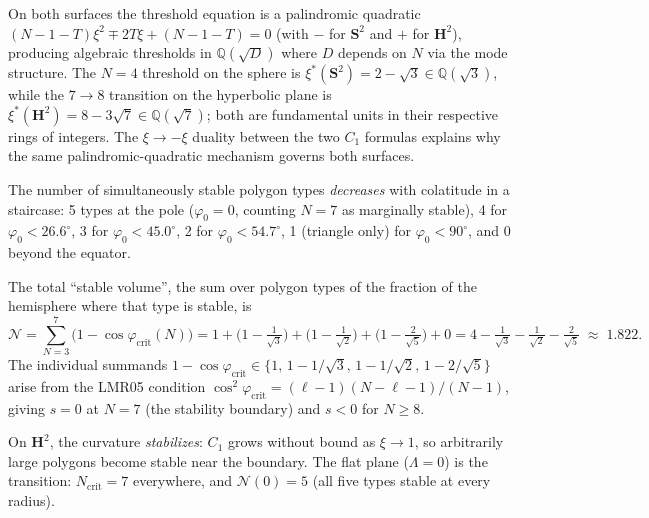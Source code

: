 \begin{remark}
On both surfaces the threshold equation is a palindromic quadratic
$(N{-}1{-}T)\xi^2 \mp 2T\xi + (N{-}1{-}T) = 0$ (with $-$ for
$\mathbf{S}^2$ and $+$ for $\mathbf{H}^2$), producing algebraic
thresholds in $\mathbb{Q}(\sqrt{D})$ where $D$ depends on $N$ via
the mode structure.  The $N = 4$ threshold on the sphere is
$\xi^*(\mathbf{S}^2) = 2 - \sqrt{3} \in \mathbb{Q}(\sqrt{3})$,
while the $7 \to 8$ transition on the hyperbolic plane is
$\xi^*(\mathbf{H}^2) = 8 - 3\sqrt{7} \in \mathbb{Q}(\sqrt{7})$;
both are fundamental units in their respective rings of integers.
The $\xi \to -\xi$ duality between the two $C_1$ formulas explains
why the same palindromic-quadratic mechanism governs both surfaces.
\end{remark}

\begin{remark}
\label{rmk:stability-staircase}
The number of simultaneously stable polygon types \emph{decreases}
with colatitude in a staircase:
5 types at the pole ($\varphi_0 = 0$, counting $N = 7$ as marginally stable),
4 for $\varphi_0 < 26.6^\circ$,
3 for $\varphi_0 < 45.0^\circ$,
2 for $\varphi_0 < 54.7^\circ$,
1 (triangle only) for $\varphi_0 < 90^\circ$,
and 0 beyond the equator.

The total ``stable volume'', the sum over polygon types of the
fraction of the hemisphere where that type is stable, is
\begin{equation}\label{eq:counting-function}
  \mathcal{N} = \sum_{N=3}^{7}
    \bigl(1 - \cos\varphi_{\mathrm{crit}}(N)\bigr)
  = 1 + \bigl(1 - \tfrac{1}{\sqrt{3}}\bigr) + \bigl(1 - \tfrac{1}{\sqrt{2}}\bigr)
    + \bigl(1 - \tfrac{2}{\sqrt{5}}\bigr) + 0
  = 4 - \tfrac{1}{\sqrt{3}} - \tfrac{1}{\sqrt{2}} - \tfrac{2}{\sqrt{5}}
  \;\approx\; 1.822.
\end{equation}
The individual summands
$1 - \cos\varphi_{\mathrm{crit}} \in
\{1,\, 1{-}1/\!\sqrt{3},\, 1{-}1/\!\sqrt{2},\, 1{-}2/\!\sqrt{5}\}$
arise from the LMR05 condition
$\cos^2\!\varphi_{\mathrm{crit}} = (\ell{-}1)(N{-}\ell{-}1)/(N{-}1)$,
giving $s = 0$ at $N = 7$ (the stability boundary) and $s < 0$
for $N \ge 8$.

On $\mathbf{H}^2$, the curvature \emph{stabilizes}: $C_1$ grows
without bound as $\xi \to 1$, so arbitrarily large polygons become
stable near the boundary.  The flat plane ($\Lambda = 0$) is the
transition: $N_{\mathrm{crit}} = 7$ everywhere, and
$\mathcal{N}(0) = 5$ (all five types stable at every radius).
\end{remark}

